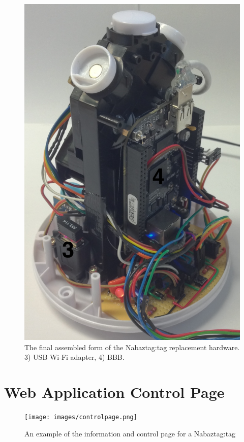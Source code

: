 \documentclass[12pt, a4paper]{article}
\begin{document}
\begin{appendices}
	\begin{figure}[H]
		\centerline{\includegraphics[scale=0.25]{images/nabazright.jpg}}
		\caption[Assembled Nabaztag:tag 2]{The final assembled form of the Nabaztag:tag replacement hardware. 3) \ac{USB} Wi-Fi adapter, 4) \acl{BBB}.}
		\label{fig:assembled2}
	\end{figure}
	
	
\newpage

\section{Web Application Control Page}\label{app:djangoapp}
	\begin{figure}[H]
		\centerline{\texttt{[image: images/controlpage.png]}}
		\caption[Nabaztag:tag web application --- Control page]{An example of the information and control page for a Nabaztag:tag}
		\label{fig:djangoapp}
	\end{figure}
	

\end{appendices}
\end{document}
